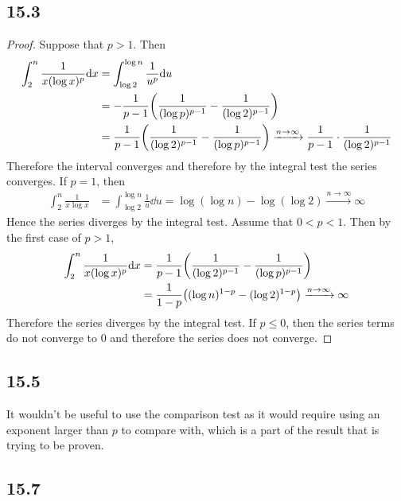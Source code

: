 \documentclass[12pt,titlepage]{extarticle}
\begin{document}
\subsection*{15.3}
\begin{proof}
    Suppose that $p > 1$. Then
    \begin{align*}
        \int_{2}^n \frac{1}{x (\log x)^p} \dd x &= \int_{\log 2}^{\log n} \frac{1}{u^p} \dd u \\
                                                &= -\frac{1}{p-1}\qty(\frac{1}{(\log p)^{p-1}} - \frac{1}{(\log 2)^{p-1}}) \\
                                                &= \frac{1}{p-1}\qty(\frac{1}{(\log 2)^{p-1}} - \frac{1}{(\log p)^{p-1}}) \xrightarrow{n \to \infty} \frac{1}{p-1}\cdot \frac{1}{(\log 2)^{p-1}}
    \end{align*}
    Therefore the interval converges and therefore by the integral test the series converges. If $p = 1$, then
    \begin{align*}
        \int_{2}^n \frac{1}{x \log x} &= \int_{\log 2}^{\log n} \frac{1}{u} \dd u = \log(\log n) - \log (\log 2) \xrightarrow{n \to \infty} \infty
    \end{align*}
    Hence the series diverges by the integral test. Assume that $0 < p < 1$. Then by the first case of $p > 1$,
    \begin{align*}
        \int_{2}^n \frac{1}{x (\log x)^p} \dd x &= \frac{1}{p-1}\qty(\frac{1}{(\log 2)^{p-1}} - \frac{1}{(\log p)^{p-1}}) \\
                                                &= \frac{1}{1 - p}\qty((\log n)^{1-p} - (\log 2)^{1-p}) \xrightarrow{n \to \infty} \infty
    \end{align*}
    Therefore the series diverges by the integral test. If $p \leq 0$, then the series terms do not converge to $0$ and therefore the series does not converge.
\end{proof}


\subsection*{15.5}
It wouldn't be useful to use the comparison test as it would require using an exponent larger than $p$ to compare with, which is a part of the result that is trying to be proven.

\subsection*{15.7}
\end{document}
